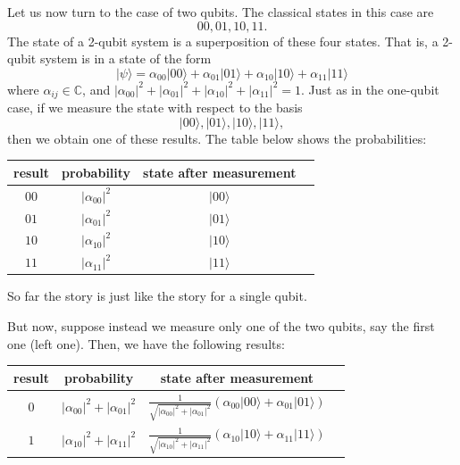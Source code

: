 \documentclass{article}
\theoremstyle{plain}
\theoremstyle{definition}
\theoremstyle{remark}
\numberwithin{theorem}{section}
\newcommand{\CC}{\mathbb{C}}
\begin{document}
Let us now turn to the case of two qubits.  The classical states in this case are 
\[
00, 01, 10, 11.
\]
The state of a 2-qubit system is a superposition of these four states.  That is, a 2-qubit system is in a state of the form
\[
|\psi\rangle =
\alpha_{00} | 00 \rangle
+ 
\alpha_{01} | 01 \rangle
+
\alpha_{10} | 10 \rangle
+
\alpha_{11} | 11 \rangle
\]
where $\alpha_{ij} \in \CC$, and $|\alpha_{00}|^2+|\alpha_{01}|^2+|\alpha_{10}|^2+|\alpha_{11}|^2 = 1$.  Just as in the one-qubit case, if we measure the state with respect to the basis
\[
|00 \rangle, 
|01 \rangle,
|10 \rangle, 
|11 \rangle, 
\]
then we obtain one of these results.  The table below shows the probabilities:
\vspace{1em}

\begin{center}

\begin{tabular}{cccc}
result & probability & state after measurement \\
\hline
$00$ & $|\alpha_{00}|^2$ & $|00 \rangle$ \\
$01$ & $|\alpha_{01}|^2$ & $|01 \rangle$ \\
$10$ & $|\alpha_{10}|^2$ & $|10 \rangle$ \\
$11$ & $|\alpha_{11}|^2$ & $|11 \rangle$ \\
\end{tabular}

\end{center}
\vspace{1em}

So far the story is just like the story for a single qubit.

But now, suppose instead we measure only one of the two qubits, say the first one (left one).  Then, we have the following results:
\vspace{1em}

\begin{center}

\begin{tabular}{cccc}
result & probability & state after measurement \\
\hline
$0$ & $|\alpha_{00}|^2+|\alpha_{01}|^2$ & $\frac{1}{\sqrt{|\alpha_{00}|^2+|\alpha_{01}|^2}}\left(\alpha_{00}|00 \rangle+\alpha_{01}|01 \rangle\right)$ \\
$1$ & $|\alpha_{10}|^2+|\alpha_{11}|^2$ & $\frac{1}{\sqrt{|\alpha_{10}|^2+|\alpha_{11}|^2}}\left(\alpha_{10}|10 \rangle+\alpha_{11}|11 \rangle\right)$ \\
\end{tabular}

\end{center}
\vspace{1em}
\end{document}
